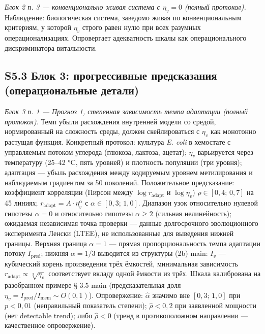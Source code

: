 \documentclass[pdflatex,sn-mathphys-ay]{sn-jnl}
\begin{document}
\emph{Блок 2 п. 3 --- конвенционально живая система с \(\eta_v = 0\) (полный протокол).} Наблюдение: биологическая система, заведомо живая по конвенциональным критериям, у которой \(\eta_v\) строго равен нулю при всех разумных операционализациях. Опровергает адекватность шкалы как операционального дискриминатора витальности.

\subsection*{S5.3 Блок 3: прогрессивные предсказания (операциональные детали)}\label{s5.3-ux431ux43bux43eux43a-3-ux43fux440ux43eux433ux440ux435ux441ux441ux438ux432ux43dux44bux435-ux43fux440ux435ux434ux441ux43aux430ux437ux430ux43dux438ux44f-ux43eux43fux435ux440ux430ux446ux438ux43eux43dux430ux43bux44cux43dux44bux435-ux434ux435ux442ux430ux43bux438}

\emph{Блок 3 п. 1 --- Прогноз 1, степенная зависимость темпа адаптации (полный протокол).} Темп убыли расхождения внутренней модели со средой, нормированный на сложность среды, должен скейлироваться с \(\eta_v\) как монотонно растущая функция. Конкретный протокол: культура \emph{E. coli} в хемостате с управляемым потоком углерода (глюкоза, лактоза, ацетат); \(\eta_v\) варьируется через температуру (25--42 °C, пять уровней) и плотность популяции (три уровня); адаптация --- убыль расхождения между кодируемым уровнем метилирования и наблюдаемым градиентом за 50 поколений. Положительное предсказание: коэффициент корреляции (Пирсон между \(\log r_{\text{adapt}}\) и \(\log \eta_v\)) \(\rho \in [0{,}4;\, 0{,}7]\) на 45 линиях; \(r_{\text{adapt}} = A \cdot \eta_v^{\alpha}\) с \(\alpha \in [0{,}3;\, 1{,}0]\). Диапазон узок относительно нулевой гипотезы \(\alpha = 0\) и относительно гипотезы \(\alpha \ge 2\) (сильная нелинейность); ожидаемая независимая точка проверки --- данные долгосрочного эволюционного эксперимента Ленски (LTEE), не использованные для выведения нижней границы. Верхняя граница \(\alpha = 1\) --- прямая пропорциональность темпа адаптации потоку \(I_{\text{pred}}\); нижняя \(\alpha = 1/3\) выводится из структуры (2b) main: \(I_v\) --- кубический корень произведения трёх ёмкостей, минимальная зависимость \(r_{\text{adapt}} \propto \sqrt[3]{\eta_v}\) соответствует вкладу одной ёмкости из трёх. Шкала калибрована на разобранном примере § 3.5 main (предсказательная доля \(\eta_v = I_{\text{pred}}/I_{\text{mem}} \sim O(0{,}1)\)). Опровержение: \(\hat{\alpha}\) значимо вне \([0{,}3;\, 1{,}0]\) при \(p < 0{,}01\) (неправильный показатель степени); \(\hat{\rho} < 0{,}2\) при заявленной мощности (нет detectable trend); либо \(\hat{\rho} < 0\) (тренд в противоположном направлении --- качественное опровержение).
\end{document}

